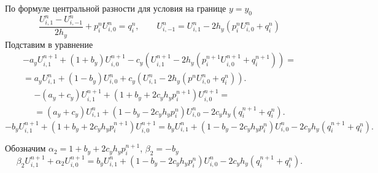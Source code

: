 \documentclass[a4paper,12pt]{article}
\begin{document}
По формуле центральной разности для условия на границе $y = y_0$
\begin{equation*}
  \frac{U^{n}_{i,1} -  U^{n}_{i,-1}}{2 h_y} + p_i^n U^n_{i,0}  = q_i^{n}, \qquad
  U^{n}_{i,-1}  = U^{n}_{i,1} - 2 h_y \left( p_i^n U^n_{i,0} + q_i^{n} \right)
\end{equation*}
Подставим в уравнение
\begin{multline*}
  - a_y U^{n+1}_{i,1} + \left( 1 + b_y  \right) U^{n+1}_{i,0} - c_y \left( U^{n+1}_{i,1} - 2 h_y (p_i^{n+1} U^{n+1}_{i,0} + q_i^{n+1}) \right) = \\
  = a_y U^{n}_{i,1} + \left(1 - b_y \right) U^{n}_{i,0} + c_y \left(  U^{n}_{i,1} - 2 h_y (p^n U^{n}_{i,0} + q_i^{n}) \right).
\end{multline*}
\begin{multline*}
  - (a_y + c_y) U^{n+1}_{i,1} + \left( 1 + b_y + 2 c_y h_y p^{n+1}_i \right) U^{n+1}_{i,0} = \\
  = (a_y + c_y) U^{n}_{i,1} + \left(1 - b_y - 2 c_y h_y p^{n}_i \right) U^{n}_{i,0} - 2 c_y h_y (q_i^{n+1} + q_i^{n}).
\end{multline*}
\begin{equation}
  - b_y U^{n+1}_{i,1} + \left( 1 + b_y  + 2 c_y h_y p^{n+1}_i \right) U^{n+1}_{i,0} =
  b_y U^{n}_{i,1} + \left(1 - b_y - 2 c_y h_y p^{n}_i \right) U^{n}_{i,0} - 2 c_y h_y (q_i^{n+1} + q_i^{n}).
\end{equation}

Обозначим $\alpha_2 = 1 + b_y  + 2 c_y h_y p^{n+1}_i $, $ \beta_2 = - b_y$
\begin{equation}
  \label{eq:2d-bc3-y0}
  \beta_2 U^{n+1}_{i,1} + \alpha_2 U^{n+1}_{i,0} =
  b_y U^{n}_{i,1} + \left(1 - b_y - 2 c_y h_y p^{n}_i \right) U^{n}_{i,0} - 2 c_y h_y (q_i^{n+1} + q_i^{n}).
\end{equation}
\end{document}
